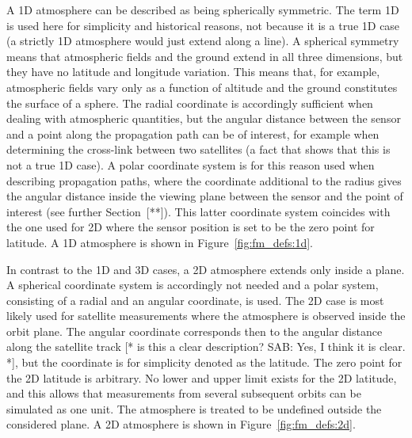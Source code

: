  A 1D atmosphere can be described as being
spherically symmetric. The term 1D is used here for simplicity and
historical reasons, not because it is a true 1D case (a strictly 1D
atmosphere would just extend along a line). A spherical symmetry means
that atmospheric fields and the ground extend in all three dimensions,
but they have no latitude and longitude variation. This means that,
for example, atmospheric fields vary only as a function of altitude
and the ground constitutes the surface of a sphere. The radial
coordinate is accordingly sufficient when dealing with atmospheric
quantities, but the angular distance between the sensor and a point
along the propagation path can be of interest, for example when
determining the cross-link between two satellites (a fact that shows
that this is not a true 1D case). A polar coordinate system is for
this reason used when describing propagation paths, where the
coordinate additional to the radius gives the angular distance inside
the viewing plane between the sensor and the point of interest (see
further Section~[**]).  This latter coordinate system coincides with
the one used for 2D where the sensor position is set to be the zero
point for latitude. A 1D atmosphere is shown in
Figure~\ref{fig:fm_defs:1d}.

 In contrast to the 1D and 3D cases, a 2D
atmosphere extends only inside a plane. A spherical coordinate system
is accordingly not needed and a polar system, consisting of a radial
and an angular coordinate, is used. The 2D case is most likely used
for satellite measurements where the atmosphere is observed inside the
orbit plane. The angular coordinate corresponds then to the angular
distance along the satellite track [* is this a clear description?
SAB: Yes, I think it is clear. *], but the coordinate is for
simplicity denoted as the latitude. The zero point for the 2D latitude
is arbitrary. No lower and upper limit exists for the 2D latitude, and
this allows that measurements from several subsequent orbits can be
simulated as one unit. The atmosphere is treated to be undefined
outside the considered plane. A 2D atmosphere is shown in
Figure~\ref{fig:fm_defs:2d}.

